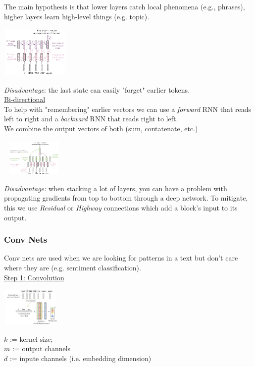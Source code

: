 \documentclass[8pt]{extarticle} %
\begin{document}
\begin{multicols*}{3}
The main hypothesis is that lower layers catch local phenomena (e.g., phrases), higher layers learn high-level things (e.g. topic).
\begin{center}
\includegraphics*[width=0.25\textwidth]{media/multi-layer.png}
\end{center}
\textit{Disadvantage}: the last state can easily "forget" earlier tokens.\\

\underline{Bi-directional}\\
To help with "remembering" earlier vectors we can use a \textit{forward} RNN that reads left to right and a \textit{backward} RNN that reads right to left.\\

We combine the output vectors of both (sum, contatenate, etc.) 
\begin{center}
\includegraphics*[width=0.25\textwidth]{media/bi-directional.png}
\end{center}

\textit{Disadvantage:} when stacking a lot of layers, you can have a problem with
propagating gradients from top to bottom through a deep network. 
To mitigate, this we use \textit{Residual} or \textit{Highway} connections which add a block's input to its output.

\subsubsection*{Conv Nets}
Conv nets are used when we are looking for patterns in a text but don't care where they are (e.g. sentiment classification).\\

\underline{Step 1: Convolution}\\
\begin{center}
\includegraphics*[width=0.24\textwidth]{media/conv-net1.png}
\end{center}
$k$ := kernel size;\\
$m$ := output channels\\
$d$ := inpute channels (i.e. embedding dimension)\\


\end{multicols*}
\end{document}
